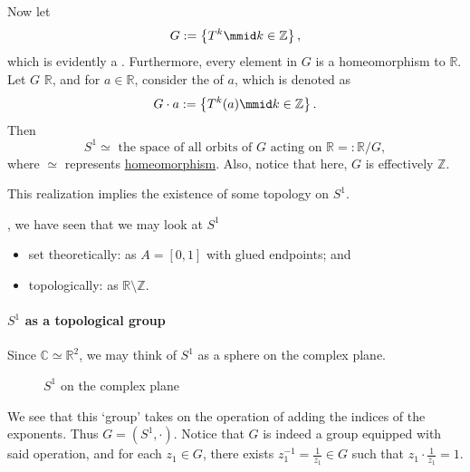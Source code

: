\documentclass[notoc,notitlepage]{tufte-book}
\begin{document}
Now let
\begin{equation*}
  G := \left\{ T^k \mmid k \in \mathbb{Z} \right\},
\end{equation*}
which is evidently a . Furthermore, every element in $G$ is a
homeomorphism to $\mathbb{R}$. Let $G$  $\mathbb{R}$, and for
$a \in \mathbb{R}$, consider the  of $a$, which is denoted as
\begin{equation*}
  G \cdot a := \left\{ T^k (a) \mmid k \in \mathbb{Z} \right\}.
\end{equation*}
Then
\begin{equation*}
  S^1 \simeq \text{ the space of all orbits of } G \text{ acting on } \mathbb{R} =: \mathbb{R} / G,
\end{equation*}
where $\simeq$ represents \hyperref[defn:homeomorphism]{homeomorphism}.
Also, notice that here, $G$ is effectively $\mathbb{Z}$.

This realization implies the existence of some topology on $S^1$.

, we have seen that we may look at $S^1$
\begin{itemize}
  \item set theoretically: as $A = [0, 1]$ with glued endpoints; and
  \item topologically: as $\mathbb{R} \setminus \mathbb{Z}$.
\end{itemize}

\paragraph{$S^1$ as a topological group}
Since $\mathbb{C} \simeq \mathbb{R}^2$, we may think of $S^1$ as a
sphere on the complex plane.
\begin{figure}[ht]
  \centering
  \caption{$S^1$ on the complex plane}
  \label{fig:_s_1_on_the_complex_plane}
\end{figure}
We see that this `group' takes on the operation of adding the indices
of the exponents. Thus $G = ( S^1, \cdot )$. Notice that $G$ is indeed
a group equipped with said operation, and for each $z_1 \in G$, there
exists $z_1^{-1} = \frac{1}{z_1} \in G$ such that 
$z_1 \cdot \frac{1}{z_1} = 1$.
\end{document}
